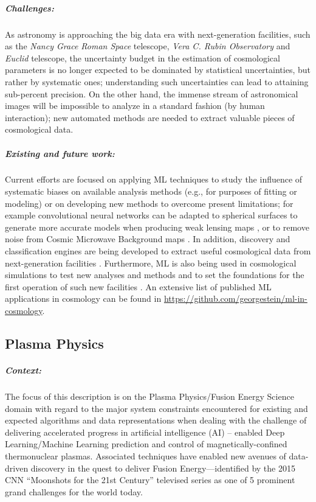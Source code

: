 \subparagraph*{Challenges:} As astronomy is approaching the big data era with next-generation facilities, such as the \textit{Nancy Grace Roman Space} telescope, \textit{Vera C. Rubin Observatory} and \textit{Euclid} telescope, the uncertainty budget in the estimation of cosmological parameters is no longer expected to be dominated by statistical uncertainties, but rather by systematic ones; understanding such uncertainties can lead to attaining sub-percent precision. 
On the other hand, the immense stream of astronomical images will be impossible to analyze in a standard fashion (by human interaction); new automated methods are needed to extract valuable pieces of cosmological data.
    
\subparagraph*{\textbf{Existing and future work}:} Current efforts are focused on applying ML techniques to study the influence of systematic biases on available analysis methods (e.g., for purposes of fitting or modeling) or on developing new methods to overcome present limitations; for example convolutional neural networks can be adapted to spherical surfaces to generate more accurate models when producing weak lensing maps \cite{Perraudin_2019}, or to remove noise from Cosmic Microwave Background maps \cite{Petroff_2020}. 
In addition, discovery and classification engines are being developed to extract useful cosmological data from next-generation facilities \citep[][]{Narayan_2018, Mahabal_2019, Forster_2020, Moller_2020}. 
Furthermore, ML is also being used in cosmological simulations to test new analyses and methods and to set the foundations for the first operation of such new facilities \citep{Kamdar16, Rodriguez18, Villaescusa-Navarro20}. 
An extensive list of published ML applications in cosmology can be found in \url{https://github.com/georgestein/ml-in-cosmology}.

\subsection{Plasma Physics}


\subparagraph*{Context:} The focus of this description is on the Plasma Physics/Fusion Energy Science domain with regard to the major system constraints encountered for existing and expected algorithms and data representations when dealing with the challenge of delivering accelerated progress in artificial intelligence (AI) – enabled Deep Learning/Machine Learning prediction and control of magnetically-confined thermonuclear plasmas.  
Associated techniques have enabled new avenues of data-driven discovery in the quest to deliver Fusion Energy---identified by the 2015 CNN ``Moonshots for the 21st Century'' televised series as one of 5 prominent grand challenges for the world today.

